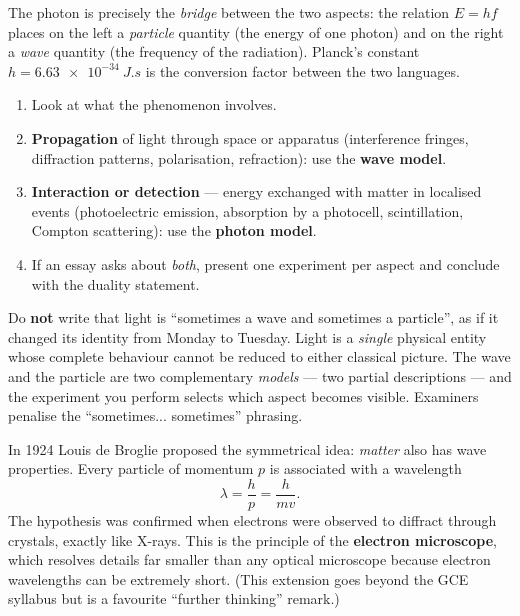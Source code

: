 \documentclass[11pt]{article}
\newcounter{popsec}
\newcounter{popsub}
\newcommand{\courssub}[1]{%
  \stepcounter{popsub}%
  \par\vspace{9pt}\noindent{\popxbold\fontsize{11.5}{13}\selectfont\color{popink}{\color{poporange}\thepopsec.\thepopsub}\hspace{6pt}#1}\par\nopagebreak\vspace{4pt}
}
\begin{document}
The photon is precisely the \emph{bridge} between the two aspects: the relation $E = hf$ places on the left a \emph{particle} quantity (the energy of one photon) and on the right a \emph{wave} quantity (the frequency of the radiation). Planck's constant $h = \SI{6.63e-34}{J.s}$ is the conversion factor between the two languages.

\begin{methode}
\begin{enumerate}
\item Look at what the phenomenon involves.
\item \textbf{Propagation} of light through space or apparatus (interference fringes, diffraction patterns, polarisation, refraction): use the \textbf{wave model}.
\item \textbf{Interaction or detection} --- energy exchanged with matter in localised events (photoelectric emission, absorption by a photocell, scintillation, Compton scattering): use the \textbf{photon model}.
\item If an essay asks about \emph{both}, present one experiment per aspect and conclude with the duality statement.
\end{enumerate}
\end{methode}

\begin{attention}
Do \textbf{not} write that light is ``sometimes a wave and sometimes a particle'', as if it changed its identity from Monday to Tuesday. Light is a \emph{single} physical entity whose complete behaviour cannot be reduced to either classical picture. The wave and the particle are two complementary \emph{models} --- two partial descriptions --- and the experiment you perform selects which aspect becomes visible. Examiners penalise the ``sometimes... sometimes'' phrasing.
\end{attention}

\courssub{Extension: Matter Waves (de Broglie)}

\begin{savaistu}
In 1924 Louis de Broglie proposed the symmetrical idea: \emph{matter} also has wave properties. Every particle of momentum $p$ is associated with a wavelength
\[ \lambda = \frac{h}{p} = \frac{h}{mv}. \]
The hypothesis was confirmed when electrons were observed to diffract through crystals, exactly like X-rays. This is the principle of the \textbf{electron microscope}, which resolves details far smaller than any optical microscope because electron wavelengths can be extremely short. (This extension goes beyond the GCE syllabus but is a favourite ``further thinking'' remark.)
\end{savaistu}
\end{document}
